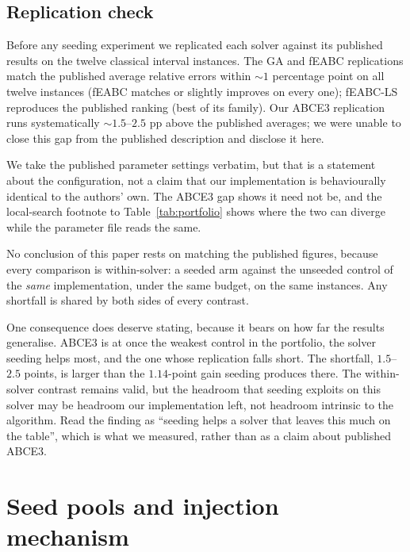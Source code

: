 \documentclass[review]{elsarticle}
\begin{document}
\subsection{Replication check}
Before any seeding experiment we replicated each solver against its
published results on the twelve classical interval instances. The GA and
fEABC replications match the published average relative errors within
${\sim}1$ percentage point on all twelve instances (fEABC matches or
slightly improves on every one); fEABC-LS reproduces the published ranking
(best of its family). Our ABCE3 replication runs systematically
${\sim}1.5$--$2.5$ pp above the published averages; we were unable to close
this gap from the published description and disclose it here.

We take the published parameter settings verbatim, but that is a statement
about the configuration, not a claim that our implementation is
behaviourally identical to the authors' own. The ABCE3 gap shows it need
not be, and the local-search footnote to Table~\ref{tab:portfolio} shows
where the two can diverge while the parameter file reads the same.

No conclusion of this paper rests on matching the published figures, because
every comparison is within-solver: a seeded arm against the unseeded control
of the \emph{same} implementation, under the same budget, on the same
instances. Any shortfall is shared by both sides of every contrast.

One consequence does deserve stating, because it bears on how far the
results generalise. ABCE3 is at once the weakest control in the portfolio,
the solver seeding helps most, and the one whose replication falls short.
The shortfall, $1.5$--$2.5$ points, is larger than the $1.14$-point gain
seeding produces there. The within-solver contrast remains valid, but the
headroom that seeding exploits on this solver may be headroom our
implementation left, not headroom intrinsic to the algorithm. Read the
finding as ``seeding helps a solver that leaves this much on the table'',
which is what we measured, rather than as a claim about published ABCE3.

\section{Seed pools and injection mechanism}\label{sec:seeding}
\end{document}
